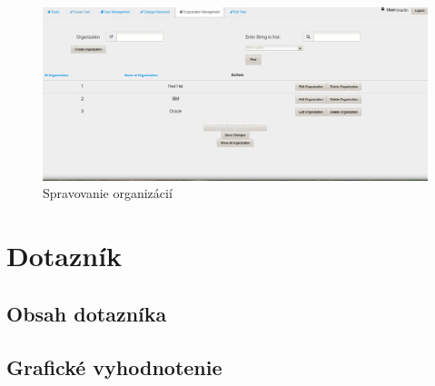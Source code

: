{\begin{figure}[htb]
\begin{center}
\end{center}

\end{figure}

\begin{figure}[htb]

\begin{center}

\includegraphics[scale=0.5]{page4.jpg} 
\caption{Spravovanie organizácií}


\end{center}

\end{figure}


}

\chapter{Dotazník}
{
	\section{Obsah dotazníka}
	{

	}


	\section{Grafické vyhodnotenie}
	{

	
	}


}


